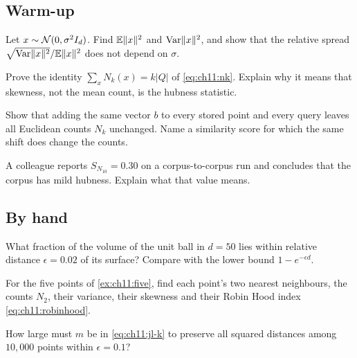 \subsection*{Warm-up}

\begin{exercise}\label{exr:ch11:scale}
Let $x\sim\mathcal{N}(0,\sigma^2I_d)$. Find $\mathbb{E}\lVert x\rVert^2$ and $\operatorname{Var}\lVert x\rVert^2$, and show that the relative spread $\sqrt{\operatorname{Var}\lVert x\rVert^2}/\mathbb{E}\lVert x\rVert^2$ does not depend on $\sigma$.
\end{exercise}

\begin{exercise}\label{exr:ch11:sum}
Prove the identity $\sum_xN_k(x)=k|Q|$ of \cref{eq:ch11:nk}. Explain why it means that skewness, not the mean count, is the hubness statistic.
\end{exercise}

\begin{exercise}\label{exr:ch11:shift}
Show that adding the same vector $b$ to every stored point and every query leaves all Euclidean counts $N_k$ unchanged. Name a similarity score for which the same shift does change the counts.
\end{exercise}

\begin{exercise}\label{exr:ch11:nullskew}
A colleague reports $S_{N_{10}}=0.30$ on a corpus-to-corpus run and concludes that the corpus has mild hubness. Explain what that value means.
\end{exercise}

\subsection*{By hand}

\begin{exercise}\label{exr:ch11:shell}
What fraction of the volume of the unit ball in $d=50$ lies within relative distance $\epsilon=0.02$ of its surface? Compare with the lower bound $1-e^{-\epsilon d}$.
\end{exercise}

\begin{exercise}\label{exr:ch11:five2}
For the five points of \cref{ex:ch11:five}, find each point's two nearest neighbours, the counts $N_2$, their variance, their skewness and their Robin Hood index \cref{eq:ch11:robinhood}.
\end{exercise}

\begin{exercise}\label{exr:ch11:jlk}
How large must $m$ be in \cref{eq:ch11:jl-k} to preserve all squared distances among $10{,}000$ points within $\epsilon=0.1$?
\end{exercise}

